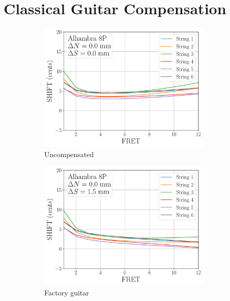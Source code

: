%
%
%

 \section{Classical Guitar Compensation\label{sct:comp}}
 

 \begin{figure}
  \centering
  \begin{subfigure}[b]{0.45\textwidth}
   \centering
   \includegraphics[width=3.25in]{figures/shift_uncompensated}
   \caption{Uncompensated}
   \label{fig:shift_uncompensated}
  \end{subfigure}
  \hspace{0.25in}
  \begin{subfigure}[b]{0.45\textwidth}
   \centering
   \includegraphics[width=3.25in]{figures/shift_factory}
   \caption{Factory guitar}
   \label{fig:shift_factory}
  \end{subfigure}
  \par\vspace{0.25in}
  \begin{subfigure}[b]{0.45\textwidth}

\end{subfigure}
\end{figure}
